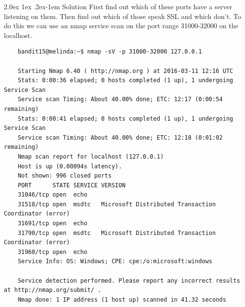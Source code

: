 \documentclass[11pt]{article}
\makeatletter
\renewcommand{\paragraph}{%
  \@startsection{paragraph}{4}%
  {\z@}{2.0ex \@plus 1ex \@minus .2ex}{-1em}%
  {\normalfont\normalsize\bfseries}%
}
\makeatother
\begin{document}
\paragraph{Solution}
First find out which of these ports have a server listening on them. Then find out which of those speak SSL and which don’t. To do this we can use an nmap service scan on the port range 31000-32000 on the localhost. 
\begin{lstlisting}
	bandit15@melinda:~$ nmap -sV -p 31000-32000 127.0.0.1

	Starting Nmap 6.40 ( http://nmap.org ) at 2016-03-11 12:16 UTC
	Stats: 0:00:36 elapsed; 0 hosts completed (1 up), 1 undergoing Service Scan
	Service scan Timing: About 40.00% done; ETC: 12:17 (0:00:54 remaining)
	Stats: 0:00:41 elapsed; 0 hosts completed (1 up), 1 undergoing Service Scan
	Service scan Timing: About 40.00% done; ETC: 12:18 (0:01:02 remaining)
	Nmap scan report for localhost (127.0.0.1)
	Host is up (0.00094s latency).
	Not shown: 996 closed ports
	PORT      STATE SERVICE VERSION
	31046/tcp open  echo
	31518/tcp open  msdtc   Microsoft Distributed Transaction Coordinator (error)
	31691/tcp open  echo
	31790/tcp open  msdtc   Microsoft Distributed Transaction Coordinator (error)
	31960/tcp open  echo
	Service Info: OS: Windows; CPE: cpe:/o:microsoft:windows

	Service detection performed. Please report any incorrect results at http://nmap.org/submit/ .
	Nmap done: 1 IP address (1 host up) scanned in 41.32 seconds


\end{lstlisting}
\end{document}
